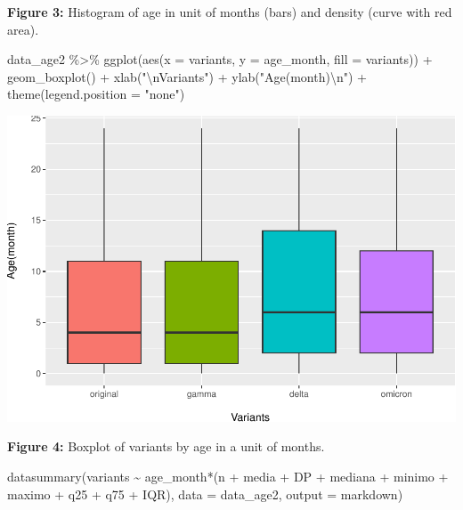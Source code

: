 \documentclass[
]{article}
\newenvironment{Shaded}{\begin{snugshade}}{\end{snugshade}}
\newcommand{\AttributeTok}[1]{\textcolor[rgb]{0.77,0.63,0.00}{#1}}
\newcommand{\FunctionTok}[1]{\textcolor[rgb]{0.00,0.00,0.00}{#1}}
\newcommand{\NormalTok}[1]{#1}
\newcommand{\SpecialCharTok}[1]{\textcolor[rgb]{0.00,0.00,0.00}{#1}}
\newcommand{\StringTok}[1]{\textcolor[rgb]{0.31,0.60,0.02}{#1}}
\renewenvironment{Shaded}{\begin{mdframed}[ backgroundcolor=shadecolor, linecolor = shadecolor, leftmargin=\dimexpr\leftmargin-2pt\relax, innerleftmargin=1.6pt, innertopmargin=5pt, skipabove=10pt,skipbelow=3pt ]}{\end{mdframed}}
\begin{document}
\textbf{Figure 3:} Histogram of age in unit of months (bars) and density
(curve with red area).

\begin{Shaded}
\begin{Highlighting}[]
\NormalTok{data\_age2 }\SpecialCharTok{\%\textgreater{}\%} 
  \FunctionTok{ggplot}\NormalTok{(}\FunctionTok{aes}\NormalTok{(}\AttributeTok{x =}\NormalTok{ variants,}
             \AttributeTok{y =}\NormalTok{ age\_month,}
             \AttributeTok{fill =}\NormalTok{ variants)) }\SpecialCharTok{+}
  \FunctionTok{geom\_boxplot}\NormalTok{() }\SpecialCharTok{+}
  \FunctionTok{xlab}\NormalTok{(}\StringTok{"}\SpecialCharTok{\textbackslash{}n}\StringTok{Variants"}\NormalTok{) }\SpecialCharTok{+}
  \FunctionTok{ylab}\NormalTok{(}\StringTok{"Age(month)}\SpecialCharTok{\textbackslash{}n}\StringTok{"}\NormalTok{) }\SpecialCharTok{+}
  \FunctionTok{theme}\NormalTok{(}\AttributeTok{legend.position =} \StringTok{"none"}\NormalTok{)}
\end{Highlighting}
\end{Shaded}

\includegraphics{age_analysis_files/figure-latex/unnamed-chunk-8-1.pdf}

\textbf{Figure 4:} Boxplot of variants by age in a unit of months.

\begin{Shaded}
\begin{Highlighting}[]
\FunctionTok{datasummary}\NormalTok{(variants }\SpecialCharTok{\textasciitilde{}}\NormalTok{ age\_month}\SpecialCharTok{*}\NormalTok{(n }\SpecialCharTok{+}\NormalTok{ media }\SpecialCharTok{+}\NormalTok{ DP }\SpecialCharTok{+}\NormalTok{ mediana }\SpecialCharTok{+}\NormalTok{ minimo }\SpecialCharTok{+}
\NormalTok{                                   maximo }\SpecialCharTok{+}\NormalTok{ q25 }\SpecialCharTok{+}\NormalTok{ q75 }\SpecialCharTok{+}\NormalTok{ IQR), }
            \AttributeTok{data =}\NormalTok{ data\_age2, }\AttributeTok{output =} \StringTok{\textquotesingle{}markdown\textquotesingle{}}\NormalTok{)}
\end{Highlighting}
\end{Shaded}
\end{document}
